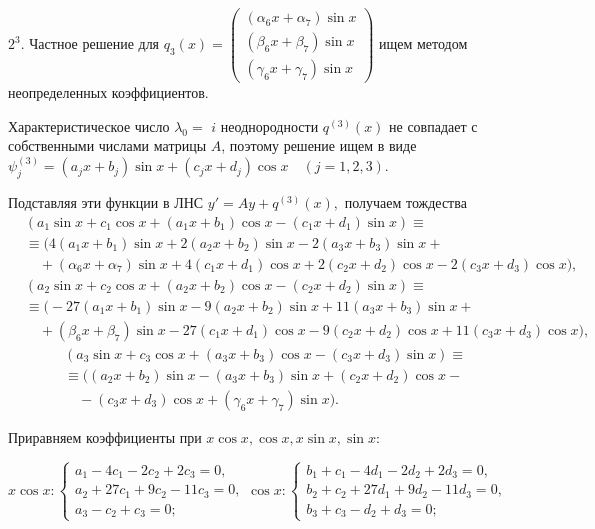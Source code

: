 \documentclass[11pt]{article}
\begin{document}
{%

\smallskip
$2^3.$ Частное решение для $q_3(x) = \begin{pmatrix} (\alpha_6 x + \alpha_7) \sin x \\ (\beta_6 x + \beta_7) \sin x \\ (\gamma_6 x + \gamma_7) \sin x \end{pmatrix}$ ищем методом неопределенных коэффициентов.

Характеристическое число $\lambda_0=$ $i$ неоднородности $q^{(3)}(x)$ не совпадает с собственными числами матрицы $A$, поэтому решение ищем в виде \\ $\psi_j^{(3)} = (a_j x + b_j) \sin x + (c_j x + d_j) \cos x \quad (j=1,2,3).$

Подставляя эти функции в ЛНС $y'=Ay+q^{(3)}(x),$ получаем тождества
\begin{align*}
&(a_1 \sin x + c_1 \cos x + (a_1 x + b_1)\cos x - (c_1 x + d_1)\sin x)\equiv \\
&\equiv \big(4(a_1 x + b_1)\sin x + 2(a_2 x + b_2)\sin x - 2(a_3 x + b_3)\sin x+ \\
&\quad + (\alpha_6 x + \alpha_7)\sin x + 4(c_1 x + d_1)\cos x + 2(c_2 x + d_2)\cos x - 2(c_3 x + d_3)\cos x\big),
\end{align*}
\vspace{-2em}
\begin{align*}
&(a_2 \sin x + c_2 \cos x + (a_2 x + b_2)\cos x - (c_2 x + d_2)\sin x)\equiv \\
&\equiv \big(-27(a_1 x + b_1)\sin x - 9(a_2 x + b_2)\sin x + 11(a_3 x + b_3)\sin x+ \\
&\quad + (\beta_6 x + \beta_7)\sin x - 27(c_1 x + d_1)\cos x - 9(c_2 x + d_2)\cos x+ 11(c_3 x + d_3)\cos x\big),
\end{align*}
\vspace{-2em}
\begin{align*}
&(a_3 \sin x + c_3 \cos x + (a_3 x + b_3)\cos x - (c_3 x + d_3)\sin x)\equiv \\
&\equiv \big((a_2 x + b_2)\sin x - (a_3 x + b_3)\sin x + (c_2 x + d_2)\cos x- \\
&\quad - (c_3 x + d_3)\cos x + (\gamma_6 x + \gamma_7)\sin x\big).
\end{align*}

\smallskip
Приравняем коэффициенты при $x \cos x, \cos x, x \sin x, \sin x$:

$x \cos x: \begin{cases} 
a_1 - 4c_1 - 2c_2 + 2c_3 = 0, \\ 
a_2 + 27c_1 + 9c_2 - 11c_3 = 0, \\ 
a_3 - c_2 + c_3 = 0; 
\end{cases}
\cos x: \begin{cases} 
b_1 + c_1 - 4d_1 - 2d_2 + 2d_3 = 0, \\ 
b_2 + c_2 + 27d_1 + 9d_2 - 11d_3 = 0, \\ 
b_3 + c_3 - d_2 + d_3 = 0; 
\end{cases}$

}
\end{document}
